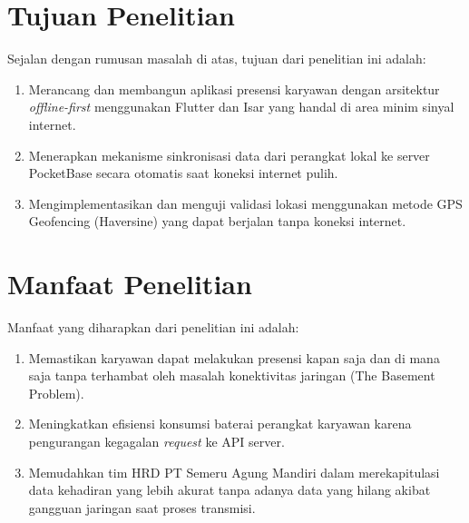 \section{Tujuan Penelitian}
Sejalan dengan rumusan masalah di atas, tujuan dari penelitian ini adalah:
\begin{enumerate}
    \item Merancang dan membangun aplikasi presensi karyawan dengan arsitektur \textit{offline-first} menggunakan Flutter dan Isar yang handal di area minim sinyal internet.
    \item Menerapkan mekanisme sinkronisasi data dari perangkat lokal ke server PocketBase secara otomatis saat koneksi internet pulih.
    \item Mengimplementasikan dan menguji validasi lokasi menggunakan metode GPS Geofencing (Haversine) yang dapat berjalan tanpa koneksi internet.
\end{enumerate}

\section{Manfaat Penelitian}
Manfaat yang diharapkan dari penelitian ini adalah:
\begin{enumerate}
    \item Memastikan karyawan dapat melakukan presensi kapan saja dan di mana saja tanpa terhambat oleh masalah konektivitas jaringan (The Basement Problem).
    \item Meningkatkan efisiensi konsumsi baterai perangkat karyawan karena pengurangan kegagalan \textit{request} ke API server.
    \item Memudahkan tim HRD PT Semeru Agung Mandiri dalam merekapitulasi data kehadiran yang lebih akurat tanpa adanya data yang hilang akibat gangguan jaringan saat proses transmisi.
\end{enumerate}
